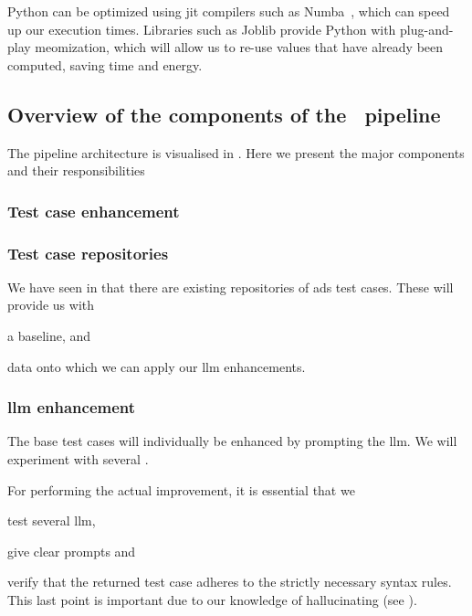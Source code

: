 Python can be optimized using \acrfull{jit} compilers such as Numba~\cite{numba}, which can speed up
our execution times. Libraries such as Joblib provide Python with plug-and-play
meomization, which will allow us to re-use values that have already been
computed, saving time and energy.


\subsection{Overview of the components of the \hefe~pipeline}

The pipeline architecture is visualised in . Here we
present the major components and their responsibilities


\subsubsection{Test case enhancement}

\subsubsection{Test case repositories}

We have seen in  that there are existing repositories of
\acrshort{ads} test cases. These will provide us with \begin{inparaenum}
    \item a baseline,
    and
    \item data onto which we can apply our \acrshort{llm} enhancements.
\end{inparaenum}

\subsubsection{\acrshort{llm} enhancement}\label{sec:llmEnhancement}

The base test cases will individually be enhanced by prompting the
\acrshort{llm}. We will experiment with several .

For performing the actual improvement, it is essential that we \begin{inparaenum}
    \item test several \acrshort{llm},
    \item give clear prompts
    and
    \item verify that the returned test case adheres to the strictly necessary
    syntax rules. This last point is important due to our knowledge of
     hallucinating (see ).
\end{inparaenum}

